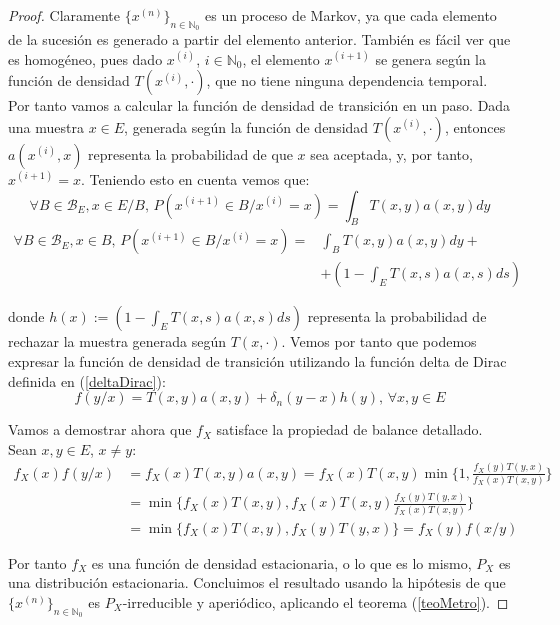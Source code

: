 \begin{proof}
Claramente $\{x^{(n)}\}_{n\in\mathds{N}_0}$ es un proceso de Markov, ya que cada elemento de la sucesión es generado a partir del elemento anterior. También es fácil ver que es homogéneo, pues dado $x^{(i)}$, $i\in\mathds{N}_0$, el elemento $x^{(i+1)}$ se genera según la función de densidad $T(x^{(i)}, \cdot)$, que no tiene ninguna dependencia temporal. Por tanto vamos a calcular la función de densidad de transición en un paso. Dada una muestra $x\in E$, generada según la función de densidad $T(x^{(i)},\cdot)$, entonces $a(x^{(i)}, x)$ representa la probabilidad de que $x$ sea aceptada, y, por tanto, $x^{(i+1)} = x$. Teniendo esto en cuenta vemos que:
$$\forall B\in\mathscr{B}_E, x\in E/B \text{, }P(x^{(i+1)}\in B/ x^{(i)}=x) = \int_B T(x,y)a(x,y) dy$$
\begin{align*}
\forall B\in\mathscr{B}_E, x\in B\text{, }P(x^{(i+1)}\in B/ x^{(i)}=x) = &\int_B T(x,y)a(x,y) dy +\\
&+ (1-\int_E T(x,s)a(x,s) ds)
\end{align*}

donde $h(x) := (1-\int_E T(x,s)a(x,s) ds)$ representa la probabilidad de rechazar la muestra generada según $T(x, \cdot)$. Vemos por tanto que podemos expresar la función de densidad de transición utilizando la función delta de Dirac definida en (\ref{deltaDirac}):
$$ f(y/x) = T(x,y)a(x,y) + \delta_n(y-x) h(y)\text{, }\forall x,y\in E$$

Vamos a demostrar ahora que $f_X$ satisface la propiedad de balance detallado. Sean $x,y\in E$, $x\neq y$:
\begin{align*}
f_X(x)f(y/x) &= f_X(x)T(x,y)a(x,y) = f_X(x)T(x,y)\min\{1,\frac{f_X(y)T(y,x)}{f_X(x)T(x,y)}\}\\
&=\min\{f_X(x)T(x,y),f_X(x)T(x,y)\frac{f_X(y)T(y,x)}{f_X(x)T(x,y)}\} \\
&= \min\{f_X(x)T(x,y),f_X(y)T(y,x)\} = f_X(y)f(x/y)
\end{align*}

Por tanto $f_X$ es una función de densidad estacionaria, o lo que es lo mismo, $P_X$ es una distribución estacionaria. Concluimos el resultado usando la hipótesis de que $\{x^{(n)}\}_{n\in\mathds{N}_0}$  es $P_X$-irreducible y aperiódico, aplicando el teorema (\ref{teoMetro}).

\end{proof}

